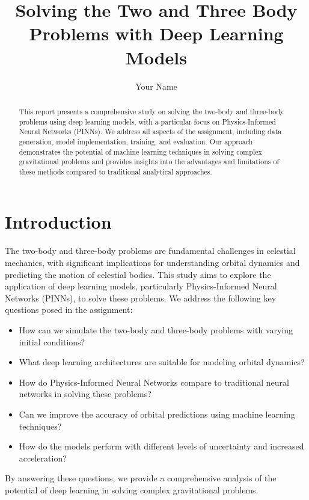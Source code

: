 \documentclass[12pt,a4paper]{article}
\title{Solving the Two and Three Body Problems with Deep Learning Models}
\author{Your Name}
\date{}
\begin{document}
\maketitle

\begin{abstract}
This report presents a comprehensive study on solving the two-body and three-body problems using deep learning models, with a particular focus on Physics-Informed Neural Networks (PINNs). We address all aspects of the assignment, including data generation, model implementation, training, and evaluation. Our approach demonstrates the potential of machine learning techniques in solving complex gravitational problems and provides insights into the advantages and limitations of these methods compared to traditional analytical approaches.
\end{abstract}

\section{Introduction}
\label{sec:introduction}
The two-body and three-body problems are fundamental challenges in celestial mechanics, with significant implications for understanding orbital dynamics and predicting the motion of celestial bodies. This study aims to explore the application of deep learning models, particularly Physics-Informed Neural Networks (PINNs), to solve these problems. We address the following key questions posed in the assignment:

\begin{itemize}
    \item How can we simulate the two-body and three-body problems with varying initial conditions?
    \item What deep learning architectures are suitable for modeling orbital dynamics?
    \item How do Physics-Informed Neural Networks compare to traditional neural networks in solving these problems?
    \item Can we improve the accuracy of orbital predictions using machine learning techniques?
    \item How do the models perform with different levels of uncertainty and increased acceleration?
\end{itemize}

By answering these questions, we provide a comprehensive analysis of the potential of deep learning in solving complex gravitational problems.
\end{document}
